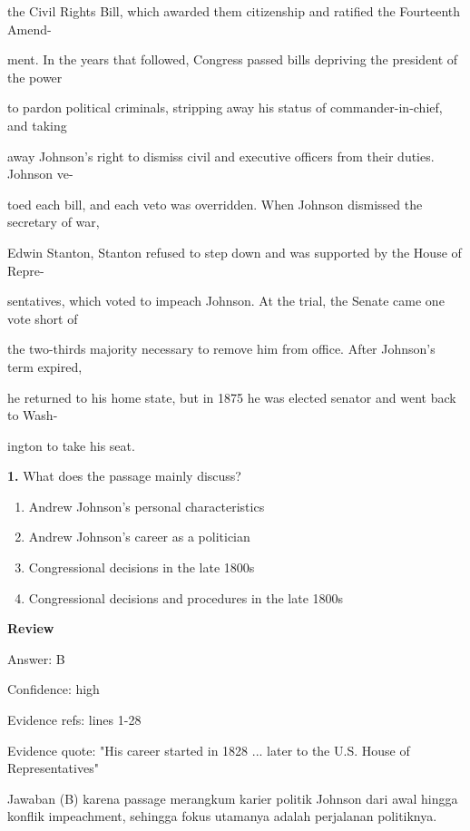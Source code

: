 \documentclass[12pt]{article}
\begin{document}
the Civil Rights Bill, which awarded them citizenship and ratified the Fourteenth Amend-\par
ment. In the years that followed, Congress passed bills depriving the president of the power\par
to pardon political criminals, stripping away his status of commander-in-chief, and taking\par
away Johnson's right to dismiss civil and executive officers from their duties. Johnson ve-\par
toed each bill, and each veto was overridden. When Johnson dismissed the secretary of war,\par
Edwin Stanton, Stanton refused to step down and was supported by the House of Repre-\par
sentatives, which voted to impeach Johnson. At the trial, the Senate came one vote short of\par
the two-thirds majority necessary to remove him from office. After Johnson's term expired,\par
he returned to his home state, but in 1875 he was elected senator and went back to Wash-\par
ington to take his seat.\par
\endgroup
\medskip
\noindent\textbf{1.} What does the passage mainly discuss?
\begin{enumerate}[label=(\Alph*),leftmargin=*,itemsep=0.2em]
\item Andrew Johnson's personal characteristics
\item Andrew Johnson's career as a politician
\item Congressional decisions in the late 1800s
\item Congressional decisions and procedures in the late 1800s
\end{enumerate}
\par
\begingroup
\setlength{\parskip}{0pt}
\setlength{\parindent}{0pt}
\textbf{Review}\par
Answer: B\par
Confidence: high\par
Evidence refs: lines 1-28\par
Evidence quote: "His career started in 1828 ... later to the U.S. House of Representatives"\par
Jawaban (B) karena passage merangkum karier politik Johnson dari awal hingga konflik impeachment, sehingga fokus utamanya adalah perjalanan politiknya.\par
\endgroup
\par
\end{document}
